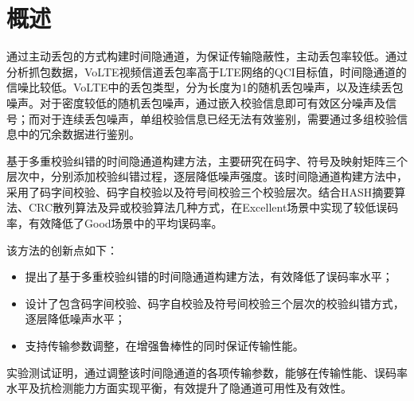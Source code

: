 \section{概述}
\label{chap:hash:overview}

通过主动丢包的方式构建时间隐通道，为保证传输隐蔽性，主动丢包率较低。通过分析抓包数据，VoLTE视频信道丢包率高于LTE网络的QCI目标值，时间隐通道的信噪比较低。VoLTE中的丢包类型，分为长度为1的随机丢包噪声，以及连续丢包噪声。对于密度较低的随机丢包噪声，通过嵌入校验信息即可有效区分噪声及信号；而对于连续丢包噪声，单组校验信息已经无法有效鉴别，需要通过多组校验信息中的冗余数据进行鉴别。

基于多重校验纠错的时间隐通道构建方法，主要研究在码字、符号及映射矩阵三个层次中，分别添加校验纠错过程，逐层降低噪声强度。该时间隐通道构建方法中，采用了码字间校验、码字自校验以及符号间校验三个校验层次。结合HASH摘要算法、CRC散列算法及异或校验算法几种方式，在Excellent场景中实现了较低误码率，有效降低了Good场景中的平均误码率。

该方法的创新点如下：
\begin{itemize}
	\item 提出了基于多重校验纠错的时间隐通道构建方法，有效降低了误码率水平；
	\item 设计了包含码字间校验、码字自校验及符号间校验三个层次的校验纠错方式，逐层降低噪声水平；
	\item 支持传输参数调整，在增强鲁棒性的同时保证传输性能。
\end{itemize}

实验测试证明，通过调整该时间隐通道的各项传输参数，能够在传输性能、误码率水平及抗检测能力方面实现平衡，有效提升了隐通道可用性及有效性。